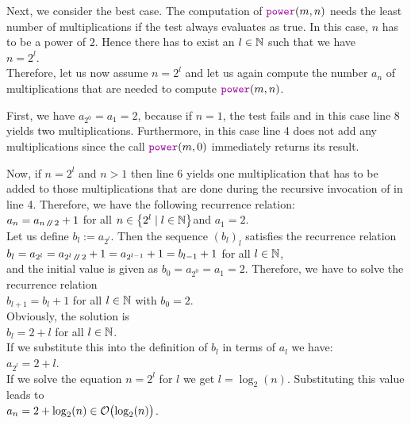 Next, we consider the best case.  The computation of
$\mytt{power}(m,n)$ needs the least number of multiplications if the test 
always evaluates as true.  In this case, $n$ has to be a power of $2$.  
Hence there has to exist an $l\in {\mathbb N}$ such that we have
 \\[0.2cm]
\hspace*{1.3cm} $n = 2^l$.
 \\[0.2cm]
Therefore, let us now assume $n = 2^l$ and let us again compute the number $a_n$ of multiplications
that are needed to compute $\mytt{power}(m,n)$. 

First, we have $a_{2^0} = a_1 = 2$, because if $n = 1$, the test  fails and in
this case line 8 yields two multiplications.  Furthermore, in this case
line 4 does not add any multiplications since the call $\mytt{power}(m,0)$ immediately returns its
result.

Now, if $n = 2^l$ and $n > 1$ then line 6 yields one multiplication that 
has to be added to those multiplications that are done during the recursive invocation of
 in line 4.  Therefore, we have the following recurrence relation:
 \\[0.2cm]
\hspace*{1.3cm} $a_n = a_{n \mbox{\scriptsize\,\texttt{/}$\!$\texttt{/}\,} 2} + 1$ \qquad for all $n \in \left\{2^l \mid l \in {\mathbb N}\right\}$\quad and
$a_1 = 2$. 
\\[0.2cm]
Let us define $b_l := a_{2^l}$.  Then the sequence $(b_l)_l$ satisfies the recurrence relation
 \\[0.2cm]
\hspace*{1.3cm} 
$b_l = a_{2^l} = a_{2^l \mbox{\scriptsize\,\texttt{/}$\!$\texttt{/}\,} 2} + 1 = a_{2^{l-1}} + 1 = b_{l-1} + 1$ \qquad for all $l\in{\mathbb N}$, \\[0.2cm]
and the initial value is given as $b_0 = a_{2^0} = a_1 = 2$.
Therefore, we have to solve the recurrence relation 
\\[0.2cm]
\hspace*{1.3cm}
 $b_{l+1} = b_l + 1$ \qquad for all $l \in {\mathbb N}$ \quad with $b_0 = 2$.\\[0.2cm]
Obviously, the solution is \\[0.2cm]
\hspace*{1.3cm} $b_l = 2 + l$ \qquad for all $l\in{\mathbb N}$.
\\[0.2cm]
If we substitute this into the definition of $b_l$ in terms of $a_l$ we have: \\[0.2cm]
\hspace*{1.3cm}
$a_{2^l} = 2 + l$. 
\\[0.2cm]
If we solve the equation $n = 2^l$ for  $l$ we get $l =
\log_2(n)$. Substituting this value leads to
\\[0.2cm]
\hspace*{1.3cm}
 $a_n = 2 + \log_2(n) \in \mathcal{O}\bigl(\log_2(n)\bigr)$.
\vspace*{0.3cm}

